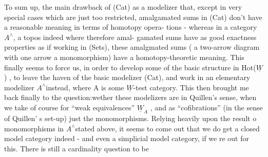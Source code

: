 To sum up,  the main drawback of (Cat) as a modelizer  that,  
except in very special cases which are just too restricted,  amalgamated
sums in (Cat) don't have a reasonable meaning in terms of homotopy opera-%
tions  -  whereas in a category $A^{\wedge}$,  a topos indeed where therefore amal-%
gamated sums have as good exactness properties as if working in (Sets),
these amalgmated sums ( a two-arrow diagram with one
arrow a monomorphism) \hand{\uline{\textcolor{black}{do}}} have a homotopy-theoretic meaning.  This finally
seems to force us,  in order to develop some of the basic structure in
Hot($\underline{W}$) ,  to leave the haven of the basic modelizer (Cat),  and work in an
elementary modelizer $A^{\wedge}$\hand{/}instead,  where A is some $\underline{W}$-test category.  This
then brought me back finally to the question:wether these modelizers are
\hand{\uline{\textcolor{black}{closed model categories}}} in Quillen's sense,  when we take of course for
``weak equivalences''  $\underline{W}_A$ ,  and as ``cofibrations'' (in the sense of Quillen'
s set-up)  just the monomorphisms.  Relying heavily upon the result o
monomorphisms in $A^{\wedge}$\hand{/}stated above,  it seems to come out that we do get a
closed model category indeed  -  and even a simplicial model category,
if we re out for this.  There is still  a cardinality question to be

